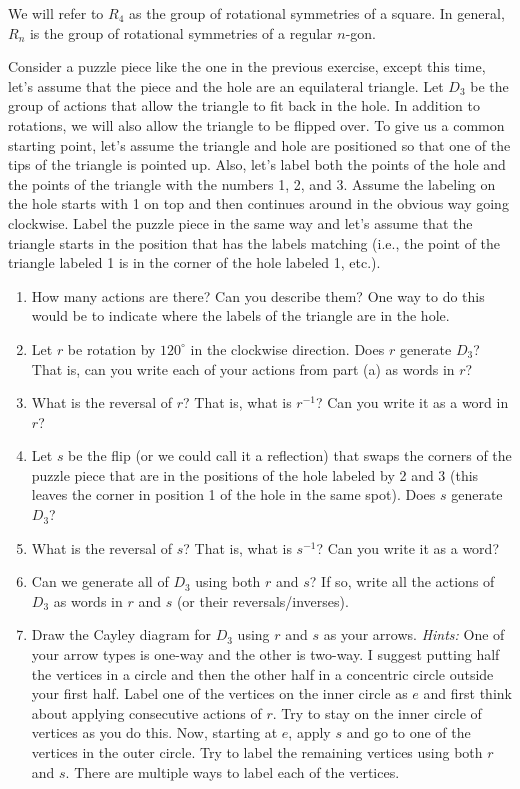 We will refer to $R_4$ as the group of rotational symmetries of a square.  In general, $R_n$ is the group of rotational symmetries of a regular $n$-gon.

\begin{exercise}\label{exer:introducing_D3}
Consider a puzzle piece like the one in the previous exercise, except this time, let's assume that the piece and the hole are an equilateral triangle.  Let $D_3$ be the group of actions that allow the triangle to fit back in the hole.  In addition to rotations, we will also allow the triangle to be flipped over.  To give us a common starting point, let's assume the triangle and hole are positioned so that one of the tips of the triangle is pointed up.  Also, let's label both the points of the hole and the points of the triangle with the numbers 1, 2, and 3.  Assume the labeling on the hole starts with 1 on top and then continues around in the obvious way going clockwise.  Label the puzzle piece in the same way and let's assume that the triangle starts in the position that has the labels matching (i.e., the point of the triangle labeled 1 is in the corner of the hole labeled 1, etc.).
\begin{enumerate}[label=\rm{(\alph*)}]
\item How many actions are there?  Can you describe them?  One way to do this would be to indicate where the labels of the triangle are in the hole.
\item Let $r$ be rotation by $120^\circ$ in the clockwise direction.  Does $r$ generate $D_3$? That is, can you write each of your actions from part (a) as words in $r$?
\item What is the reversal of $r$?  That is, what is $r^{-1}$? Can you write it as a word in $r$?
\item Let $s$ be the flip (or we could call it a reflection) that swaps the corners of the puzzle piece that are in the positions of the hole labeled by 2 and 3 (this leaves the corner in position 1 of the hole in the same spot).  Does $s$ generate $D_3$?
\item What is the reversal of $s$?  That is, what is $s^{-1}$? Can you write it as a word?
\item Can we generate all of $D_3$ using both $r$ and $s$?  If so, write all the actions of $D_3$ as words in $r$ and $s$ (or their reversals/inverses).
\item Draw the Cayley diagram for $D_3$ using $r$ and $s$ as your arrows.  \emph{Hints:} One of your arrow types is one-way and the other is two-way.  I suggest putting half the vertices in a circle and then the other half in a concentric circle outside your first half.  Label one of the vertices on the inner circle as $e$ and first think about applying consecutive actions of $r$.  Try to stay on the inner circle of vertices as you do this.  Now, starting at $e$, apply $s$ and go to one of the vertices in the outer circle.  Try to label the remaining vertices using both $r$ and $s$.  There are multiple ways to label each of the vertices.
\end{enumerate}
\end{exercise}

